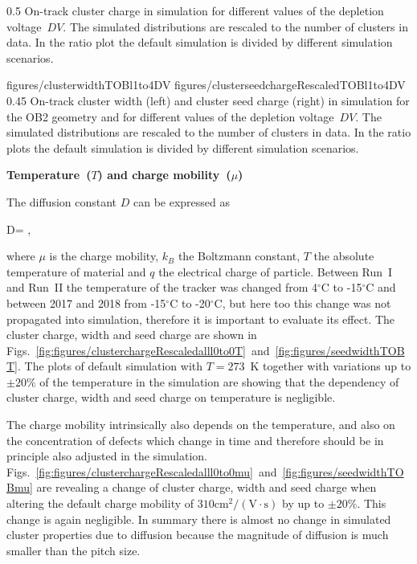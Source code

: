                  {0.5}       %
                 {  On-track cluster charge in simulation for different values of the depletion voltage~$DV$.  The simulated distributions are rescaled to the number of clusters in data. In the ratio plot the default simulation is divided by different simulation scenarios. }

                 {figures/clusterwidthTOBl1to4DV}
                 {figures/clusterseedchargeRescaledTOBl1to4DV} %
                 {0.45}       %
                 {  On-track cluster width (left) and cluster seed charge (right) in simulation  for the OB2 geometry and for different values of the depletion voltage~$DV$.  The simulated distributions are rescaled to the number of clusters in data. In the ratio plots the default simulation is divided by different simulation scenarios. }

\textbf{Temperature~($T$) and charge mobility~($\mu$)}

The diffusion constant $D$ can be expressed as

{
   D=  ,
}

where $\mu$ is the charge mobility, $k_{B}$ the Boltzmann constant, $T$ the absolute temperature of material and $q$ the electrical charge of particle. Between Run~I and Run~II the temperature of the tracker was changed from 4$^{\circ}$C to -15$^{\circ}$C and between 2017 and 2018 from -15$^{\circ}$C to -20$^{\circ}$C, but here too this change was not propagated into simulation, therefore it is important to evaluate its effect. The cluster charge, width and seed charge are shown in Figs.~\ref{fig:figures/clusterchargeRescaledalll0to0T}~and~\ref{fig:figures/seedwidthTOBT}. The plots of default simulation with $T=273$~K together with variations up to $\pm 20\%$ of the temperature in the simulation are showing that the dependency of cluster charge, width and seed charge on temperature is negligible. 

The charge mobility intrinsically also depends on the temperature, and also on the concentration of defects which change in time and therefore should be in principle also adjusted in the simulation. Figs.~\ref{fig:figures/clusterchargeRescaledalll0to0mu}~and~\ref{fig:figures/seedwidthTOBmu} are revealing a change of cluster charge, width and seed charge when altering the default charge mobility of $310 \mathrm{cm^2/(V \cdot s)}$ by up to $\pm 20\%$. This change is again negligible. In summary there is almost no change in simulated cluster properties due to diffusion because the magnitude of diffusion is much smaller than the pitch size.


